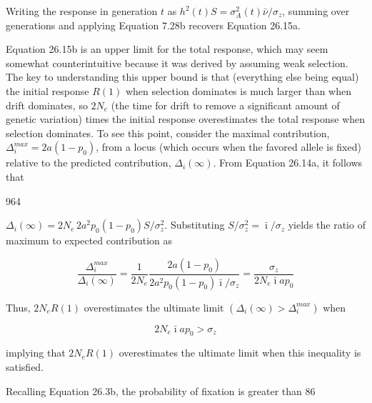 \documentclass{article}
\begin{document}
Writing the response in generation  $ t $ as  $ h^2(t)S = \sigma_A^2(t) \bar{\nu}/\sigma_z $, summing over generations and applying Equation 7.28b recovers Equation 26.15a.

Equation 26.15b is an upper limit for the total response, which may seem somewhat counterintuitive because it was derived by assuming weak selection. The key to understanding this upper bound is that (everything else being equal) the initial response  $ R(1) $ when selection dominates is much larger than when drift dominates, so  $ 2N_e $ (the time for drift to remove a significant amount of genetic variation) times the initial response overestimates the total response when selection dominates. To see this point, consider the maximal contribution,  $ \Delta_i^{max} = 2a(1 - p_0) $, from a locus (which occurs when the favored allele is fixed) relative to the predicted contribution,  $ \Delta_i(\infty) $. From Equation 26.14a, it follows that

964

 $ \Delta_i(\infty) = 2N_e\,2a^2p_0(1 - p_0)S/\sigma_z^2 $. Substituting  $ S/\sigma_z^2 = \bar{\imath}/\sigma_z $ yields the ratio of maximum to expected contribution as

\begin{equation}
\frac{\Delta_{i}^{max}}{\Delta_{i}(\infty)}=\frac{1}{2N_{e}}\frac{2a(1-p_{0})}{2a^{2}p_{0}(1-p_{0})\bar{\imath}/\sigma_{z}}=\frac{\sigma_{z}}{2N_{e}\bar{\imath}a p_{0}}
\tag{26.16a}
\label{eq:26_16a}
\end{equation}

Thus,  $ 2N_e R(1) $ overestimates the ultimate limit  $ (\Delta_i(\infty) > \Delta_i^{max}) $ when

\begin{equation}
2N_{e}\bar{\imath}a p_{0}>\sigma_{z}
\tag{26.16b}
\label{eq:26_16b}
\end{equation}

implying that  $ 2N_{e}R(1) $ overestimates the ultimate limit when this inequality is satisfied.

Recalling Equation 26.3b, the probability of fixation is greater than 86%
\end{document}
